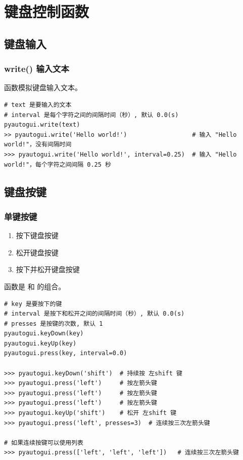 \chapter{键盘控制函数}

\section{键盘输入}
\subsection{write() 输入文本}
 函数模拟键盘输入文本。
\begin{lstlisting}[style=demostyle,numbers=none]
# text 是要输入的文本
# interval 是每个字符之间的间隔时间（秒）, 默认 0.0(s)
pyautogui.write(text)
>> pyautogui.write('Hello world!')                  # 输入 "Hello world!"，没有间隔时间
>>> pyautogui.write('Hello world!', interval=0.25)  # 输入 "Hello world!"，每个字符之间间隔 0.25 秒
\end{lstlisting}

\section{键盘按键}
\subsection{单键按键}
\begin{enumerate}[label=\arabic*)]
    \item {} 按下键盘按键
    \item {} 松开键盘按键
    \item {} 按下并松开键盘按键
\end{enumerate}
 函数是  和  的组合。
\begin{lstlisting}[style=demostyle,numbers=none]
# key 是要按下的键
# interval 是按下和松开之间的间隔时间（秒）, 默认 0.0(s)
# presses 是按键的次数, 默认 1
pyautogui.keyDown(key)
pyautogui.keyUp(key)
pyautogui.press(key, interval=0.0)  

>>> pyautogui.keyDown('shift')  # 持续按 左shift 键
>>> pyautogui.press('left')     # 按左箭头键
>>> pyautogui.press('left')     # 按左箭头键
>>> pyautogui.press('left')     # 按左箭头键
>>> pyautogui.keyUp('shift')    # 松开 左shift 键
>>> pyautogui.press('left', presses=3)  # 连续按三次左箭头键

# 如果连续按键可以使用列表
>>> pyautogui.press(['left', 'left', 'left'])   # 连续按三次左箭头键
\end{lstlisting}


